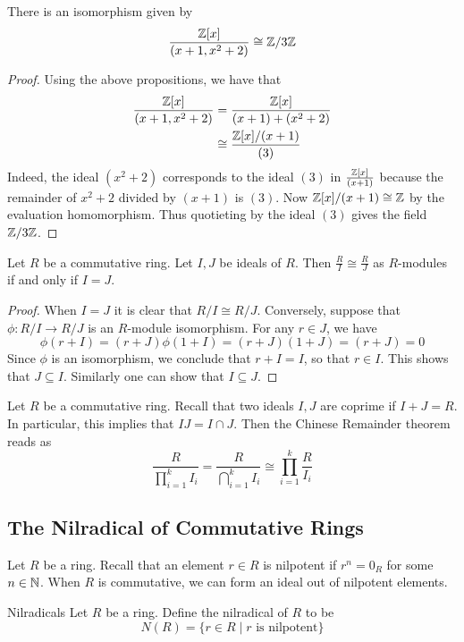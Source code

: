 \documentclass[a4paper]{article}
\begin{document}
\begin{eg}{}{} There is an isomorphism given by $$\frac{\mathbb{Z}[x]}{(x+1,x^2+2)}\cong\mathbb{Z}/3\mathbb{Z}$$ \tcbline
\begin{proof}
Using the above propositions, we have that 
\begin{align*}
\frac{\mathbb{Z}[x]}{(x+1,x^2+2)}&=\frac{\mathbb{Z}[x]}{(x+1)+(x^2+2)}\\
&\cong\frac{\mathbb{Z}[x]/(x+1)}{(3)}
\end{align*}
Indeed, the ideal $(x^2+2)$ corresponds to the ideal $(3)$ in $\frac{\mathbb{Z}[x]}{(x+1)}$ because the remainder of $x^2+2$ divided by $(x+1)$ is $(3)$. Now $\mathbb{Z}[x]/(x+1)\cong\mathbb{Z}$ by the evaluation homomorphism. Thus quotieting by the ideal $(3)$ gives the field $\mathbb{Z}/3\mathbb{Z}$. 
\end{proof}
\end{eg}

\begin{prp}{}{} Let $R$ be a commutative ring. Let $I,J$ be ideals of $R$. Then $\frac{R}{I}\cong\frac{R}{J}$ as $R$-modules if and only if $I=J$. \tcbline
\begin{proof}
When $I=J$ it is clear that $R/I\cong R/J$. Conversely, suppose that $\phi:R/I\to R/J$ is an $R$-module isomorphism. For any $r\in J$, we have $$\phi(r+I)=(r+J)\phi(1+I)=(r+J)(1+J)=(r+J)=0$$ Since $\phi$ is an isomorphism, we conclude that $r+I=I$, so that $r\in I$. This shows that $J\subseteq I$. Similarly one can show that $I\subseteq J$. 
\end{proof}
\end{prp}

Let $R$ be a commutative ring. Recall that two ideals $I,J$ are coprime if $I+J=R$. In particular, this implies that $IJ=I\cap J$. Then the Chinese Remainder theorem reads as $$\frac{R}{\prod_{i=1}^kI_i}=\frac{R}{\bigcap_{i=1}^kI_i}\cong\prod_{i=1}^k\frac{R}{I_i}$$

\subsection{The Nilradical of Commutative Rings}
Let $R$ be a ring. Recall that an element $r\in R$ is nilpotent if $r^n=0_R$ for some $n\in\mathbb{N}$. When $R$ is commutative, we can form an ideal out of nilpotent elements. 

\begin{defn}{Nilradicals}{} Let $R$ be a ring. Define the nilradical of $R$ to be $$N(R)=\{r\in R\;|\;r\text{ is nilpotent}\}$$
\end{defn}
\end{document}
